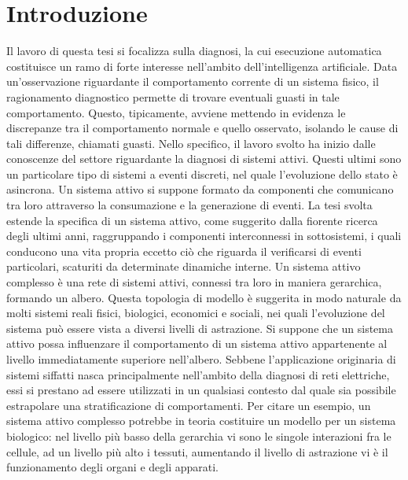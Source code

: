 \chapter{Introduzione}
Il lavoro di questa tesi si focalizza sulla diagnosi, la cui esecuzione automatica costituisce un ramo di forte interesse nell'ambito dell'intelligenza artificiale. Data un'osservazione riguardante il comportamento corrente di un sistema fisico, il ragionamento diagnostico permette di trovare eventuali guasti in tale comportamento. Questo, tipicamente, avviene mettendo in evidenza le discrepanze tra il comportamento normale e quello osservato, isolando le cause di tali differenze, chiamati guasti. Nello specifico, il lavoro svolto ha inizio dalle conoscenze del settore riguardante la diagnosi di sistemi attivi. Questi ultimi sono un particolare tipo di sistemi a eventi discreti, nel quale l'evoluzione dello stato è asincrona. Un sistema attivo si suppone formato da componenti che comunicano tra loro attraverso la consumazione e la generazione di eventi. La tesi svolta estende la specifica di un sistema attivo, come suggerito dalla fiorente ricerca degli ultimi anni, raggruppando i componenti interconnessi in sottosistemi, i quali conducono una vita propria eccetto ciò che riguarda il verificarsi di eventi particolari, scaturiti da determinate dinamiche interne. Un sistema attivo complesso è una rete di sistemi attivi, connessi tra loro in maniera gerarchica, formando un albero. Questa topologia di modello è suggerita in modo naturale da molti sistemi reali fisici, biologici, economici e sociali, nei quali l'evoluzione del sistema può essere vista a diversi livelli di astrazione. Si suppone che un sistema attivo possa influenzare il comportamento di un sistema attivo appartenente al livello immediatamente superiore nell'albero.
Sebbene l'applicazione originaria di sistemi siffatti nasca principalmente nell'ambito della diagnosi di reti elettriche, essi si prestano ad essere utilizzati in un qualsiasi contesto dal quale sia possibile estrapolare una stratificazione di comportamenti. Per citare un esempio, un sistema attivo complesso potrebbe in teoria costituire un modello per un sistema biologico: nel livello più basso della gerarchia vi sono le singole interazioni fra le cellule, ad un livello più alto i tessuti, aumentando il livello di astrazione vi è il funzionamento degli organi e degli apparati.
